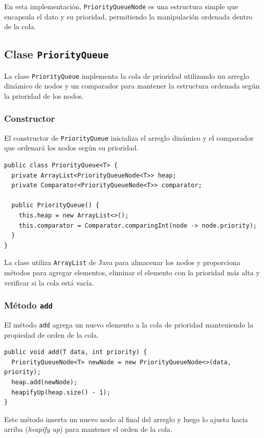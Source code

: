 \documentclass[10pt, a4paper]{article}
\newcommand{\mj}[1]{\texttt{#1}}
\begin{document}
En esta implementación, \mj{PriorityQueueNode} es una estructura simple que encapsula el dato y su prioridad, permitiendo la manipulación ordenada dentro de la cola.

\subsection{Clase \mj{PriorityQueue}}

La clase \mj{PriorityQueue} implementa la cola de prioridad utilizando un arreglo dinámico de nodos y un comparador para mantener la estructura ordenada según la prioridad de los nodos.

\subsubsection{Constructor}

El constructor de \mj{PriorityQueue} inicializa el arreglo dinámico y el comparador que ordenará los nodos según su prioridad.

\begin{verbatim}
public class PriorityQueue<T> {
  private ArrayList<PriorityQueueNode<T>> heap;
  private Comparator<PriorityQueueNode<T>> comparator;

  public PriorityQueue() {
    this.heap = new ArrayList<>();
    this.comparator = Comparator.comparingInt(node -> node.priority);
  }
}
\end{verbatim}

La clase utiliza \mj{ArrayList} de Java para almacenar los nodos y proporciona métodos para agregar elementos, eliminar el elemento con la prioridad más alta y verificar si la cola está vacía.

\subsubsection{Método \mj{add}}

El método \mj{add} agrega un nuevo elemento a la cola de prioridad manteniendo la propiedad de orden de la cola.

\begin{verbatim}
public void add(T data, int priority) {
  PriorityQueueNode<T> newNode = new PriorityQueueNode<>(data, priority);
  heap.add(newNode);
  heapifyUp(heap.size() - 1);
}
\end{verbatim}

Este método inserta un nuevo nodo al final del arreglo y luego lo ajusta hacia arriba (\emph{heapify up}) para mantener el orden de la cola.
\end{document}
